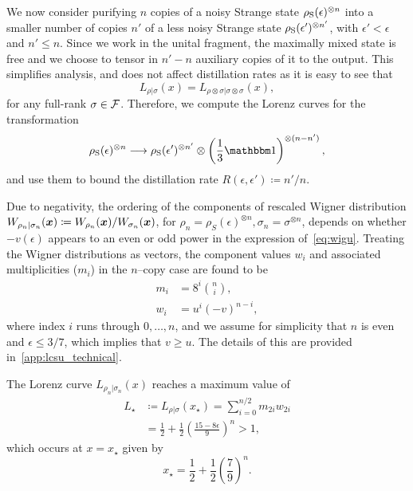 \documentclass[pra,
aps,
twocolumn,
superscriptaddress,
groupedaddress,
nofootinbib,
reprint
]{revtex4-1}
\begin{document}
We now consider purifying $n$ copies of a noisy Strange state $\rho_{\rm{S}}(\epsilon)^{\otimes n}$ into a smaller number of copies $n'$ of a less noisy Strange state $\rho_{\rm{S}}(\epsilon')^{\otimes n'}$, with $\epsilon' < \epsilon$ and $n' \leq n$. Since we work in the unital fragment, the maximally mixed state is free and we choose to tensor in $n'-n$ auxiliary copies of it to the output. This simplifies analysis, and does not affect distillation rates as it is easy to see that
\begin{equation}
	L_{\rho |\sigma} (x) = L_{\rho \otimes \sigma |\sigma \otimes \sigma}(x),
\end{equation}
for any full-rank $\sigma \in {\mathcal F}$. Therefore, we compute the Lorenz curves for the transformation
\begin{equation}\label{eq:sudist}
	\rho_{\rm{S}}(\epsilon)^{\otimes n} \longrightarrow \rho_{\rm{S}}(\epsilon')^{\otimes n'} \otimes \left( \frac{1}{3}\id \right)^{\otimes (n-n')},
\end{equation}
and use them to bound the distillation rate $R(\epsilon, \epsilon') \coloneqq n'/n$.

Due to negativity, the ordering of the components of rescaled Wigner distribution $W_{\rho_n |\sigma_n}(\bm{x}) \coloneqq W_{\rho_n}(\bm{x})/W_{\sigma_n}(\bm{x})$, for $\rho_n = \rho_S(\epsilon)^{\otimes n}, \sigma_n = \sigma^{\otimes n}$, depends on whether $-v(\epsilon)$ appears to an even or odd power in the expression of~\cref{eq:wigu}. Treating the Wigner distributions as vectors, the component values $w_i$ and associated multiplicities ($m_i$) in the $n$--copy case are found to be 
\begin{align}
	m_i &= 8^{i}\binom{n}{i}, \\
	w_i &= u^{i}(-v)^{n-i}, \label{eq:wigu}
\end{align}
where index $i$ runs through $0, \dots, n$, and we assume for simplicity that $n$ is even and $\epsilon \leq 3/7$, which implies that $v \geq u$.
The details of this are provided in~\cref{app:lcsu_technical}.

The Lorenz curve $L_{\rho_n|\sigma_n}(x)$ reaches a maximum value of
\begin{align}\label{eq:lcsu_max}
	L_\star &\coloneqq L_{\rho |\sigma} (x_\star) = \sum_{i = 0}^{n/2} m_{2i} w_{2i} \nonumber\\
	&= \frac{1}{2} + \frac{1}{2}\left(\frac{15 - 8\epsilon}{9}\right)^n > 1,
\end{align}
which occurs at $x=x_\star$ given by
\begin{equation}
	x_\star = \frac{1}{2} + \frac{1}{2}\left(\frac{7}{9}\right)^n.
\end{equation}
\end{document}
